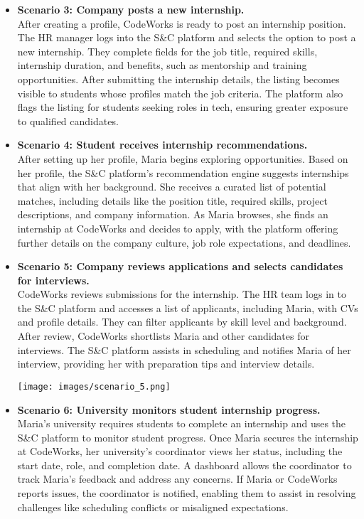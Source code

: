 \begin{itemize}
    \item \textbf{Scenario 3: Company posts a new internship.} \\
    After creating a profile, CodeWorks is ready to post an internship position. The HR manager logs into the S\&C platform and selects the option to post a new internship. They complete fields for the job title, required skills, internship duration, and benefits, such as mentorship and training opportunities. After submitting the internship details, the listing becomes visible to students whose profiles match the job criteria. The platform also flags the listing for students seeking roles in tech, ensuring greater exposure to qualified candidates. 

    \item \textbf{Scenario 4: Student receives internship recommendations.}  \\
    After setting up her profile, Maria begins exploring opportunities. Based on her profile, the S\&C platform’s recommendation engine suggests internships that align with her background. She receives a curated list of potential matches, including details like the position title, required skills, project descriptions, and company information. As Maria browses, she finds an internship at CodeWorks and decides to apply, with the platform offering further details on the company culture, job role expectations, and deadlines.
    
    \item \textbf{Scenario 5: Company reviews applications and selects candidates for interviews.} \\ 
    CodeWorks reviews submissions for the internship. The HR team logs in to the S\&C platform and accesses a list of applicants, including Maria, with CVs and profile details. They can filter applicants by skill level and background. After review, CodeWorks shortlists Maria and other candidates for interviews. The S\&C platform assists in scheduling and notifies Maria of her interview, providing her with preparation tips and interview details.

    \vspace{7mm}
    \texttt{[image: images/scenario\_5.png]}
    \vspace{7mm}

    \item \textbf{Scenario 6: University monitors student internship progress.} \\
    Maria’s university requires students to complete an internship and uses the S\&C platform to monitor student progress. Once Maria secures the internship at CodeWorks, her university’s coordinator views her status, including the start date, role, and completion date. A dashboard allows the coordinator to track Maria’s feedback and address any concerns. If Maria or CodeWorks reports issues, the coordinator is notified, enabling them to assist in resolving challenges like scheduling conflicts or misaligned expectations.


\end{itemize}
